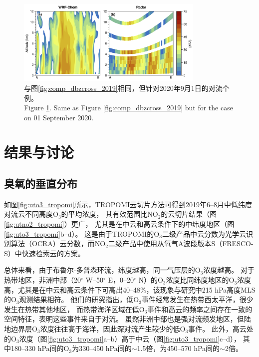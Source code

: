 \begin{figure}[!htbp]
\centering
\includegraphics[width=0.8\textwidth]{./figures/comp_dbzcross_2019.png}
\caption{与图\ref{fig:comp_dbzcross_2019}相同，但针对2020年9月1日的对流个例。\\
Figure \ref{fig:comp_dbzcross_2020}. Same as Figure \ref{fig:comp_dbzcross_2019} but for the case on 01 September 2020.}
\label{fig:comp_dbzcross_2020}
\end{figure}



\section{结果与讨论}

\subsection{臭氧的垂直分布} \label{sec:o3_profile}

如图\ref{fig:uto3_tropomi}所示，TROPOMI云切片方法可得到2019年6--8月中低纬度对流云不同高度O$_3$的平均浓度，
其有效范围比NO$_2$的云切片结果（图\ref{fig:utno2_tropomi}）更广，
尤其是在中云和高云条件下的中纬度地区（图\ref{fig:uto3_tropomi}b--d）。
这是由于TROPOMI的O$_3$二级产品中云分数为光学云识别算法（OCRA）云分数，而NO$_2$二级产品中使用从氧气A波段版本S（FRESCO-S）中快速检索云的方案。

总体来看，由于布鲁尔-多普森环流，纬度越高，同一气压层的O$_3$浓度越高。
对于热带地区，非洲中部（20$^{\circ}$ W--50$^{\circ}$ E，0--20$^{\circ}$ N）的O$_3$浓度比同纬度地区的O$_3$浓度高，尤其是在中云和高云条件下可高出40--48\%，该现象与\citet{Cooper.2013}研究中215 hPa高度MLS的O$_3$观测结果相符。
他们的研究指出，低O$_3$事件经常发生在热带西太平洋，很少发生在热带其他地区，
而热带海洋区域在低O$_3$事件和高云的频率之间存在一致的空间特征，表明这些事件来自于对流。
虽然非洲中部也是强对流频发地区，但陆地边界层O$_3$浓度往往高于海洋，因此深对流产生较少的低O$_3$事件。
此外，高云处的O$_3$浓度（图\ref{fig:uto3_tropomi}a--b）高于中云（图\ref{fig:uto3_tropomi}c--d），
其中180--330 hPa间的O$_3$为330--450 hPa间的$\sim$1.5倍，为450--570 hPa间的$\sim$2倍。

